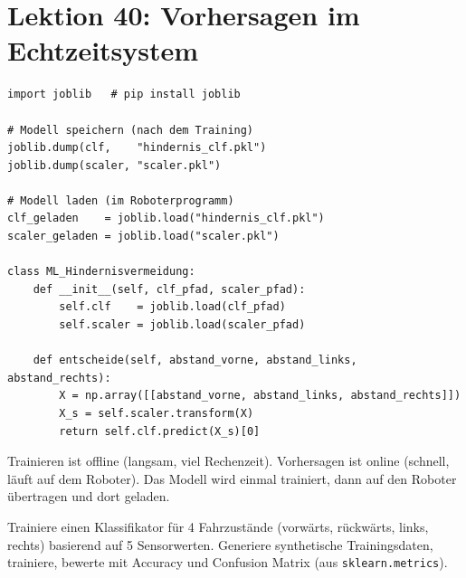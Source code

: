 \section{Lektion 40: Vorhersagen im Echtzeitsystem}

\begin{lstlisting}
import joblib   # pip install joblib

# Modell speichern (nach dem Training)
joblib.dump(clf,    "hindernis_clf.pkl")
joblib.dump(scaler, "scaler.pkl")

# Modell laden (im Roboterprogramm)
clf_geladen    = joblib.load("hindernis_clf.pkl")
scaler_geladen = joblib.load("scaler.pkl")

class ML_Hindernisvermeidung:
    def __init__(self, clf_pfad, scaler_pfad):
        self.clf    = joblib.load(clf_pfad)
        self.scaler = joblib.load(scaler_pfad)

    def entscheide(self, abstand_vorne, abstand_links, abstand_rechts):
        X = np.array([[abstand_vorne, abstand_links, abstand_rechts]])
        X_s = self.scaler.transform(X)
        return self.clf.predict(X_s)[0]
\end{lstlisting}

\begin{merksatz}
Trainieren ist offline (langsam, viel Rechenzeit). Vorhersagen ist online (schnell, läuft auf dem Roboter). Das Modell wird einmal trainiert, dann auf den Roboter übertragen und dort geladen.
\end{merksatz}

\begin{uebung}[title=Projektaufgabe Modul 14: Gesten-Erkennung]
Trainiere einen Klassifikator für 4 Fahrzustände (vorwärts, rückwärts, links, rechts) basierend auf 5 Sensorwerten. Generiere synthetische Trainingsdaten, trainiere, bewerte mit Accuracy und Confusion Matrix (aus \texttt{sklearn.metrics}).
\end{uebung}
